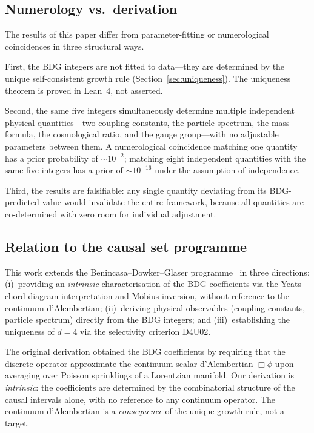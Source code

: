 \documentclass[12pt,a4paper]{article}
\begin{document}
\subsection{Numerology vs.\ derivation}\label{sec:numerology}

The results of this paper differ from parameter-fitting or numerological coincidences in three structural ways.

First, the BDG integers are not fitted to data---they are determined by the unique self-consistent growth rule (Section~\ref{sec:uniqueness}). The uniqueness theorem is proved in Lean~4, not asserted.

Second, the same five integers simultaneously determine multiple independent physical quantities---two coupling constants, the particle spectrum, the mass formula, the cosmological ratio, and the gauge group---with no adjustable parameters between them. A numerological coincidence matching one quantity has a prior probability of $\sim 10^{-2}$; matching eight independent quantities with the same five integers has a prior of $\sim 10^{-16}$ under the assumption of independence.

Third, the results are falsifiable: any single quantity deviating from its BDG-predicted value would invalidate the entire framework, because all quantities are co-determined with zero room for individual adjustment.

\subsection{Relation to the causal set programme}\label{sec:causal_set_relation}

This work extends the Benincasa--Dowker--Glaser programme~\cite{BenincasaDowker2010,DowkerGlaser2013,Glaser2014} in three directions: (i)~providing an \emph{intrinsic} characterisation of the BDG coefficients via the Yeats chord-diagram interpretation and M\"obius inversion, without reference to the continuum d'Alembertian; (ii)~deriving physical observables (coupling constants, particle spectrum) directly from the BDG integers; and (iii)~establishing the uniqueness of $d=4$ via the selectivity criterion D4U02.

The original derivation obtained the BDG coefficients by requiring that the discrete operator approximate the continuum scalar d'Alembertian $\Box\phi$ upon averaging over Poisson sprinklings of a Lorentzian manifold. Our derivation is \emph{intrinsic}: the coefficients are determined by the combinatorial structure of the causal intervals alone, with no reference to any continuum operator. The continuum d'Alembertian is a \emph{consequence} of the unique growth rule, not a target.
\end{document}
